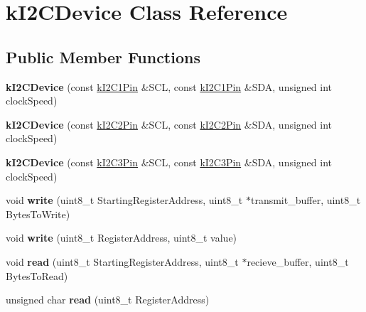 \hypertarget{classkI2CDevice}{}\section{k\+I2\+C\+Device Class Reference}
\label{classkI2CDevice}
\subsection*{Public Member Functions}
\begin{DoxyCompactItemize}
\item 
{\bfseries k\+I2\+C\+Device} (const \hyperlink{structkI2C1Pin}{k\+I2\+C1\+Pin} \&S\+CL, const \hyperlink{structkI2C1Pin}{k\+I2\+C1\+Pin} \&S\+DA, unsigned int clock\+Speed)\hypertarget{classkI2CDevice_ad4ea485f71060c28713e55a23fd05b86}{}\label{classkI2CDevice_ad4ea485f71060c28713e55a23fd05b86}

\item 
{\bfseries k\+I2\+C\+Device} (const \hyperlink{structkI2C2Pin}{k\+I2\+C2\+Pin} \&S\+CL, const \hyperlink{structkI2C2Pin}{k\+I2\+C2\+Pin} \&S\+DA, unsigned int clock\+Speed)\hypertarget{classkI2CDevice_adbb52b2b61c0358a015af1fa71de83ea}{}\label{classkI2CDevice_adbb52b2b61c0358a015af1fa71de83ea}

\item 
{\bfseries k\+I2\+C\+Device} (const \hyperlink{structkI2C3Pin}{k\+I2\+C3\+Pin} \&S\+CL, const \hyperlink{structkI2C3Pin}{k\+I2\+C3\+Pin} \&S\+DA, unsigned int clock\+Speed)\hypertarget{classkI2CDevice_a1ff149208c797fe3619b233930340ac7}{}\label{classkI2CDevice_a1ff149208c797fe3619b233930340ac7}

\item 
void {\bfseries write} (uint8\+\_\+t Starting\+Register\+Address, uint8\+\_\+t $\ast$transmit\+\_\+buffer, uint8\+\_\+t Bytes\+To\+Write)\hypertarget{classkI2CDevice_a777e881385da3b286d99fd74c20a90dc}{}\label{classkI2CDevice_a777e881385da3b286d99fd74c20a90dc}

\item 
void {\bfseries write} (uint8\+\_\+t Register\+Address, uint8\+\_\+t value)\hypertarget{classkI2CDevice_a5bbe4810f14dc08693240b2a82e83c51}{}\label{classkI2CDevice_a5bbe4810f14dc08693240b2a82e83c51}

\item 
void {\bfseries read} (uint8\+\_\+t Starting\+Register\+Address, uint8\+\_\+t $\ast$recieve\+\_\+buffer, uint8\+\_\+t Bytes\+To\+Read)\hypertarget{classkI2CDevice_aee7738a6e13e451f59ff5ec5e98ced21}{}\label{classkI2CDevice_aee7738a6e13e451f59ff5ec5e98ced21}

\item 
unsigned char {\bfseries read} (uint8\+\_\+t Register\+Address)\hypertarget{classkI2CDevice_af9185267e48384e0d717d5792a80232b}{}\label{classkI2CDevice_af9185267e48384e0d717d5792a80232b}

\end{DoxyCompactItemize}
